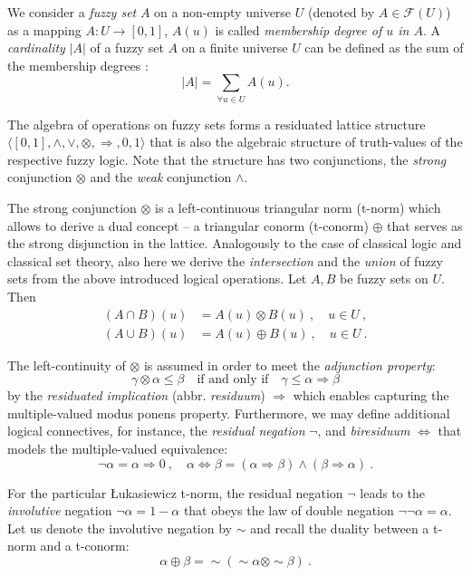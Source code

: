\documentclass[review]{elsarticle}
\begin{document}
We consider a \emph{fuzzy set} $A$ on a non-empty universe $U$ (denoted by $A\in\mathcal{F}(U)$) as a mapping $A: U \to [0, 1]$, $A(u)$ is called \emph{membership degree of $u$ in $A$}. A \emph{cardinality} $|A|$ of a fuzzy set $A$ on a finite universe $U$ can be defined as
the sum of the membership degrees \citep{novak1999}:
%
$$|A| = \sum_{\forall u\in U} A(u).$$

The algebra of operations on fuzzy sets forms a residuated lattice structure $\langle [0,1], \wedge, \vee, \otimes , \Rightarrow , 0 , 1 \rangle$ that is also  the algebraic structure of truth-values of the respective fuzzy logic. Note that the structure has two conjunctions, the \emph{strong} conjunction $\otimes$ and the \emph{weak} conjunction $\wedge$. 

The strong conjunction $\otimes$ is a left-continuous triangular norm (t-norm) which allows to derive a dual concept -- a triangular conorm (t-conorm) $\oplus$ that serves as the strong disjunction in the lattice. Analogously to the case of classical logic and classical set theory, also here we derive the \emph{intersection} and the \emph{union} of fuzzy sets from the above introduced logical operations. Let $A, B$ be fuzzy sets on $U$. Then
\begin{align*}
    (A\cap B)(u) &= A(u) \otimes B(u) \ , \quad u\in U \ ,\\
    (A\cup B)(u) &= A(u) \oplus B(u) \ , \quad u\in U \ .
\end{align*}



The left-continuity of $\otimes$ is assumed in order to meet the \emph{adjunction property}:
%
$$\gamma \otimes \alpha \le \beta\quad\textrm{if and only if}\quad \gamma \le \alpha \Rightarrow \beta   $$
%
by the \emph{residuated implication} \citep{Baczynski_Jayaram_2008c} (abbr. \emph{residuum}) $\Rightarrow$ which enables  capturing the multiple-valued modus ponens property.
Furthermore, we may define additional logical connectives, for instance, the \emph{residual negation} $\lnot$,
and \emph{biresiduum}  $\Leftrightarrow$ that models the multiple-valued equivalence:
\begin{equation*}
\lnot\alpha = \alpha \Rightarrow 0 \ , \quad 
\alpha \Leftrightarrow \beta = (\alpha \Rightarrow \beta) \wedge (\beta \Rightarrow \alpha)\ .
\end{equation*}


For the particular \L ukasiewicz t-norm, the residual negation $\lnot$ leads to the  \emph{involutive} negation $\neg \alpha = 1-\alpha$ that obeys the law of double negation $\lnot\lnot\alpha = \alpha$. Let us denote the involutive negation by $\sim$ and recall the duality between a t-norm and a t-conorm:
$$\alpha\oplus\beta = {\sim}({\sim}\alpha \otimes {\sim}\beta)\ .$$
\end{document}
